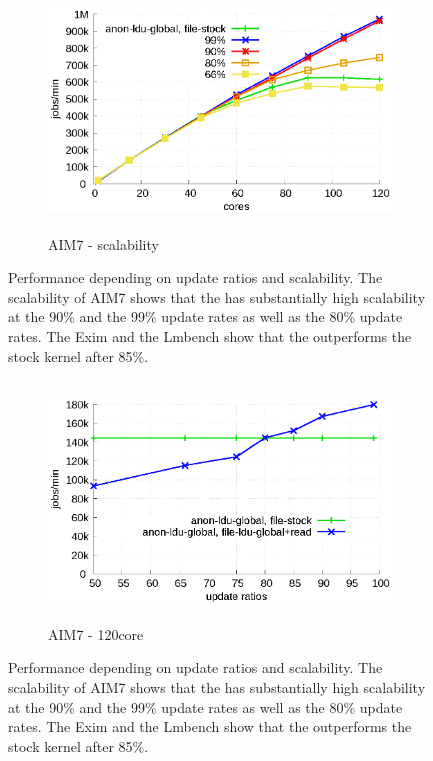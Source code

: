 \begin{figure}[t!]
    \centering
    \begin{subfigure}[b]{1\textwidth}
        \includegraphics[height=2.5in]{graph/ratio_aim7_core.eps}
        \caption{AIM7 - scalability}
    \end{subfigure}%
    \caption{Performance depending on update ratios and scalability.
    The scalability of AIM7 shows that the \LDU has substantially high
    scalability at the 90\% and the 99\% update rates as well as
    the 80\% update rates. The Exim and the Lmbench show that the \LDU outperforms the stock kernel after 85\%.}
    \label{fig:UpdateRate_aim7_2}
\end{figure}

\begin{figure}[t!]
    \centering
    \begin{subfigure}[b]{1\textwidth}
  \begin{center}
        \includegraphics[height=2.5in]{graph/ratio_exim.eps}
        \caption{AIM7 - 120core}
  \end{center}
    \end{subfigure}%
    \caption{Performance depending on update ratios and scalability.
    The scalability of AIM7 shows that the \LDU has substantially high
    scalability at the 90\% and the 99\% update rates as well as
    the 80\% update rates. The Exim and the Lmbench show that the \LDU outperforms the stock kernel after 85\%.}
    \label{fig:UpdateRate_exim}
\end{figure}

